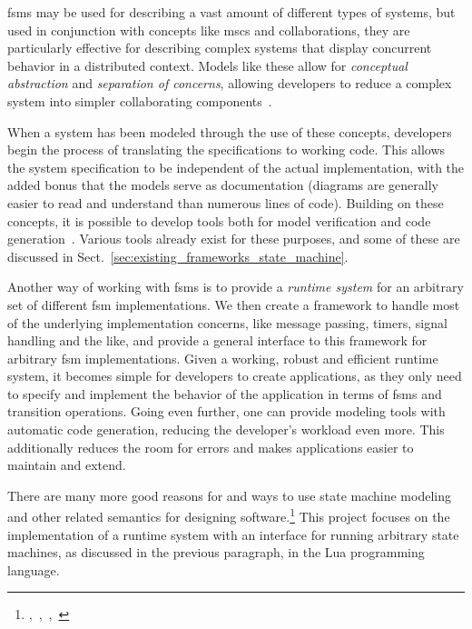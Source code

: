 \noindent
\glspl{fsm} may be used for describing a vast amount of different types of systems, but used in conjunction with concepts like \glspl{msc} and collaborations, they are particularly effective for describing complex systems that display concurrent behavior in a distributed context. Models like these allow for \emph{conceptual abstraction} and \emph{separation of concerns}, allowing developers to reduce a complex system into simpler collaborating components~\cite{article:itut_methodologies}.

\noindent
When a system has been modeled through the use of these concepts, developers begin the process of translating the specifications to working code. This allows the system specification to be independent of the actual implementation, with the added bonus that the models serve as documentation (diagrams are generally easier to read and understand than numerous lines of code). Building on these concepts, it is possible to develop tools both for model verification and code generation~\cite{article:compositional_arctis}. Various tools already exist for these purposes, and some of these are discussed in Sect.~\ref{sec:existing_frameworks_state_machine}.

\noindent
Another way of working with \glspl{fsm} is to provide a \emph{runtime system} for an arbitrary set of different \gls{fsm} implementations. We then create a framework to handle most of the underlying implementation concerns, like message passing, timers, signal handling and the like, and provide a general interface to this framework for arbitrary \gls{fsm} implementations. Given a working, robust and efficient runtime system, it becomes simple for developers to create applications, as they only need to specify and implement the behavior of the application in terms of \glspl{fsm} and transition operations. Going even further, one can provide modeling tools with automatic code generation, reducing the developer's workload even more. This additionally reduces the room for errors and makes applications easier to maintain and extend.

\noindent
There are many more good reasons for and ways to use state machine modeling and other related semantics for designing software.\footnote{\cite{article:itut_methodologies},~\cite{chapter:structural_modeling_uml},~\cite{conference:system_analysis_modeling},~\cite{phd:frank}} This project focuses on the implementation of a runtime system with an interface for running arbitrary state machines, as discussed in the previous paragraph, in the Lua programming language.


